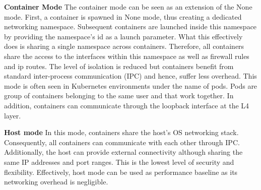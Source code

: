 \documentclass[conference]{IEEEtran}
\begin{document}
\noindent\textbf{Container Mode}\hspace{0.2cm} The container mode can be seen as an extension of the None mode. First, a container is spawned in None mode, thus creating a dedicated networking namespace. Subsequent containers are launched inside this namespace by providing the namespace's id as a launch parameter. What this effectively does is sharing a single namespace across containers. Therefore, all containers share the access to the interfaces within this namespace as well as firewall rules and ip routes. The level of isolation is reduced but containers benefit from standard inter-process communication (IPC) and hence, suffer less overhead. This mode is often seen in Kubernetes environments under the name of pods. Pods are group of containers belonging to the same user and that work together. In addition, containers can communicate through the loopback interface at the L4 layer.

\noindent\textbf{Host mode} \hspace{0.2cm}In this mode, containers share the host's OS networking stack. Consequently, all containers can communicate with each other through IPC. Additionally, the host can provide external connectivity although sharing the same IP addresses and port ranges. This is the lowest level of security and flexibility. Effectively, host mode can be used as performance baseline as its networking overhead is negligible.
\end{document}
